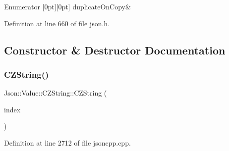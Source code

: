 \begin{DoxyEnumFields}{Enumerator}
[0pt][0pt]{}\hypertarget{class_json_1_1_value_1_1_c_z_string_a2805c46fb4a72bbaed55de6d75941b6da7475312715c35dc630985fc2d8ce4095}{}\label{class_json_1_1_value_1_1_c_z_string_a2805c46fb4a72bbaed55de6d75941b6da7475312715c35dc630985fc2d8ce4095} 
duplicate\+On\+Copy&\\
\hline

\end{DoxyEnumFields}


Definition at line 660 of file json.\+h.



\subsection{Constructor \& Destructor Documentation}
\hypertarget{class_json_1_1_value_1_1_c_z_string_a4b8aa6eaabdec78cffec96e088da996f}{}\label{class_json_1_1_value_1_1_c_z_string_a4b8aa6eaabdec78cffec96e088da996f} 
\subsubsection{\texorpdfstring{C\+Z\+String()}{CZString()}\hspace{0.1cm}{\footnotesize\ttfamily [1/6]}}
{\footnotesize\ttfamily Json\+::\+Value\+::\+C\+Z\+String\+::\+C\+Z\+String (\begin{DoxyParamCaption}\item[{\hyperlink{class_json_1_1_value_a184a91566cccca7b819240f0d5561c7d}{Array\+Index}}]{index }\end{DoxyParamCaption})}



Definition at line 2712 of file jsoncpp.\+cpp.

\hypertarget{class_json_1_1_value_1_1_c_z_string_a86a86eaf0cf26d4c861d0daa359d608a}{}\label{class_json_1_1_value_1_1_c_z_string_a86a86eaf0cf26d4c861d0daa359d608a} 
